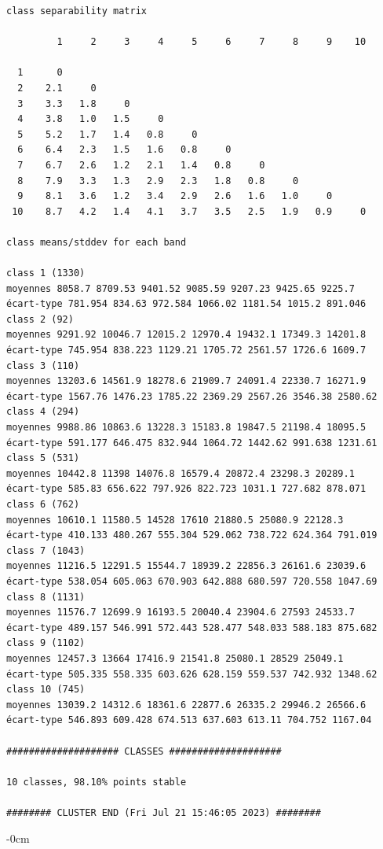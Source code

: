 \documentclass[land,article,submit,pdftex,moreauthors]{Definitions/mdpi}
\begin{document}
\begin{scriptsize}
\begin{verbatim}
class separability matrix

         1     2     3     4     5     6     7     8     9    10

  1      0
  2    2.1     0
  3    3.3   1.8     0
  4    3.8   1.0   1.5     0
  5    5.2   1.7   1.4   0.8     0
  6    6.4   2.3   1.5   1.6   0.8     0
  7    6.7   2.6   1.2   2.1   1.4   0.8     0
  8    7.9   3.3   1.3   2.9   2.3   1.8   0.8     0
  9    8.1   3.6   1.2   3.4   2.9   2.6   1.6   1.0     0
 10    8.7   4.2   1.4   4.1   3.7   3.5   2.5   1.9   0.9     0

class means/stddev for each band

class 1 (1330)
moyennes 8058.7 8709.53 9401.52 9085.59 9207.23 9425.65 9225.7
écart-type 781.954 834.63 972.584 1066.02 1181.54 1015.2 891.046
class 2 (92)
moyennes 9291.92 10046.7 12015.2 12970.4 19432.1 17349.3 14201.8
écart-type 745.954 838.223 1129.21 1705.72 2561.57 1726.6 1609.7
class 3 (110)
moyennes 13203.6 14561.9 18278.6 21909.7 24091.4 22330.7 16271.9
écart-type 1567.76 1476.23 1785.22 2369.29 2567.26 3546.38 2580.62
class 4 (294)
moyennes 9988.86 10863.6 13228.3 15183.8 19847.5 21198.4 18095.5
écart-type 591.177 646.475 832.944 1064.72 1442.62 991.638 1231.61
class 5 (531)
moyennes 10442.8 11398 14076.8 16579.4 20872.4 23298.3 20289.1
écart-type 585.83 656.622 797.926 822.723 1031.1 727.682 878.071
class 6 (762)
moyennes 10610.1 11580.5 14528 17610 21880.5 25080.9 22128.3
écart-type 410.133 480.267 555.304 529.062 738.722 624.364 791.019
class 7 (1043)
moyennes 11216.5 12291.5 15544.7 18939.2 22856.3 26161.6 23039.6
écart-type 538.054 605.063 670.903 642.888 680.597 720.558 1047.69
class 8 (1131)
moyennes 11576.7 12699.9 16193.5 20040.4 23904.6 27593 24533.7
écart-type 489.157 546.991 572.443 528.477 548.033 588.183 875.682
class 9 (1102)
moyennes 12457.3 13664 17416.9 21541.8 25080.1 28529 25049.1
écart-type 505.335 558.335 603.626 628.159 559.537 742.932 1348.62
class 10 (745)
moyennes 13039.2 14312.6 18361.6 22877.6 26335.2 29946.2 26566.6
écart-type 546.893 609.428 674.513 637.603 613.11 704.752 1167.04

#################### CLASSES ####################

10 classes, 98.10% points stable

######## CLUSTER END (Fri Jul 21 15:46:05 2023) ########
\end{verbatim}
\end{scriptsize}

\let\cleardoublepage\clearpage

\begin{adjustwidth}{-\extralength}{0cm}




\end{adjustwidth}
\end{document}
